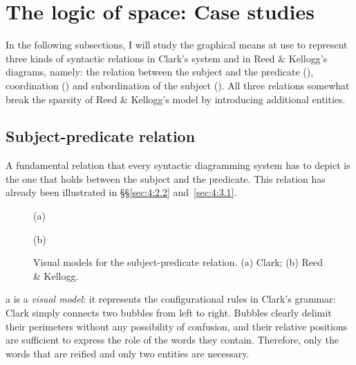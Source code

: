 \documentclass[english,output=paper,colorlinks,citecolor=brown]{../langscibook}
\begin{document}
\section{The logic of space: Case studies}\label{sec:4:4}

In the following subsections, I will study the graphical means at use to represent three kinds of syntactic relations in Clark’s system and in Reed \& Kellogg’s diagrams, namely: the relation between the subject and the predicate (), coordination () and subordination of the subject (). All three relations somewhat break the sparsity of Reed \& Kellogg’s model by introducing additional entities.

\subsection{Subject-predicate relation}\label{sec:4:4.1}

A fundamental relation that every syntactic diagramming system has to depict is the one that holds between the subject and the predicate. This relation has already been illustrated in §§\ref{sec:4:2.2} and~\ref{sec:4:3.1}.

\begin{figure}
    (a) \hspace{1em} 
    \hspace{2cm}
    (b) \hspace{1em} 
    \caption{Visual models for the subject-predicate relation. (a) Clark; (b) Reed \& Kellogg.\label{fig:4:5}}
\end{figure}


a is a \textit{visual model}: it represents the configurational rules in Clark’s grammar: Clark simply connects two bubbles from left to right. Bubbles clearly delimit their perimeters without any possibility of confusion, and their relative positions are sufficient to express the role of the words they contain. Therefore, only the words that are reified and only two entities are necessary.
\end{document}
